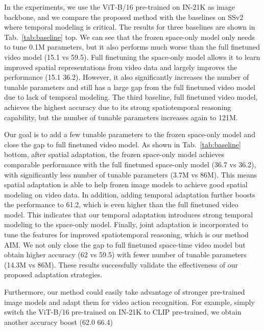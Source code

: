 \documentclass{article} \usepackage{iclr2023_conference,times}
\begin{document}
	In the experiments, we use the ViT-B/16 pre-trained on IN-21K as image backbone, and we compare the proposed method with the baselines on SSv2 \citep{goyal2017something} where temporal modeling is critical. 
The results for three baselines are shown in Tab.\ \ref{tab:baseline} top. 
	We can see that the frozen space-only model only needs to  tune 0.1M parameters, but it also performs much worse than the full finetuned video model (15.1 vs 59.5). 
	Full finetuning the space-only model allows it to learn improved spatial representations from video data and largely improves the performance (15.1  36.2). 
	However, it also significantly increases the number of tunable parameters and still has a large gap from the full finetuned video model due to  lack of temporal modeling.
	The third baseline, full finetuned video model, achieves the highest accuracy due to its strong spatiotemporal reasoning capability, but the number of tunable parameters increases again to 121M.
	
	Our goal is to add a few tunable parameters to the frozen space-only model and close the gap to full finetuned video model. 
	As shown in Tab.\ \ref{tab:baseline} bottom, after spatial adaptation, the frozen space-only model achieves comparable performance with the full finetuned space-only model (36.7 vs 36.2), with significantly less number of tunable parameters (3.7M vs 86M).
	This means spatial adaptation is able to help frozen image models to achieve good spatial modeling on video data.
	In addition, adding temporal adaptation further boosts the performance to 61.2, which is even higher than the full finetuned video model. 
	This indicates that our temporal adaptation introduces strong temporal modeling to the space-only model. 
	Finally, joint adaptation is incorporated to tune the features for improved spatiotemporal reasoning, which is our method AIM. 
	We not only close the gap to full finetuned space-time video model but obtain higher accuracy (62 vs 59.5) with fewer number of tunable parameters (14.3M vs 86M).
	These results successfully validate the effectiveness of our proposed adaptation strategies. 
	
	Furthermore, our method could easily take advantage of stronger pre-trained image models and adapt them for video action recognition. 
	For example, simply switch the ViT-B/16 pre-trained on IN-21K to CLIP pre-trained, we obtain another accuracy boost (62.0  66.4)
	
	
\end{document}

